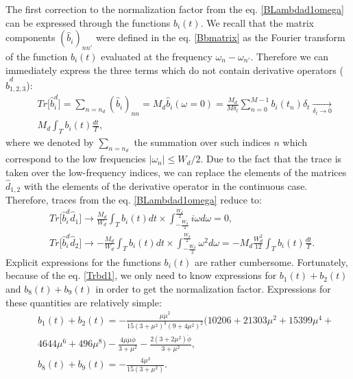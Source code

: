 \documentclass{article}
\begin{document}
The first correction to the normalization factor from the eq$.$ \eqref{BLambdad1omega} can be expressed through the functions $b_{i}(t)$. We recall that the matrix components $(\hat{b}_{i})_{nn'}$ were defined in the eq$.$ \eqref{Bbmatrix} as the Fourier transform of the function $b_{i}(t)$ evaluated at the frequency $\omega_{n} - \omega_{n'}$. Therefore we can immediately express the three terms which do not contain derivative operators ($\hat{b}_{1,2,3}^{d}$):
\begin{eqnarray}\label{BTrb}
    &&Tr\Big[\hat{b}_{i}^{d}\Big] = \sum_{n = n_{d}} (\hat{b}_{i})_{nn} = M_{d} \hat{b}_{i}(\omega = 0) = \frac{M_{d}}{M\delta_{t}} \sum_{n = 0}^{M-1} b_{i}(t_{n}) \delta_{t} \underset{\delta_{t}\rightarrow0}{\rightarrow}\nonumber\\
    &&M_{d} \int_{T} b_{i}(t) \frac{dt}{T},
\end{eqnarray}
where we denoted by $\sum_{n=n_{d}}$ the summation over such indices $n$ which correspond to the low frequencies $|\omega_{n}|\leq W_{d}/2$. Due to the fact that the trace is taken over the low-frequency indices, we can replace the elements of the matrices $\hat{d}_{1,2}$ with the elements of the derivative operator in the continuous case. Therefore, traces from the eq$.$ \eqref{BLambdad1omega} reduce to:
\begin{align}
    &Tr\Big[\hat{b}_{i}^{d}\hat{d}_{1}\Big] \rightarrow \frac{M_{d}}{W_{d}} \int_{T} b_{i}(t) dt \times \int_{-\frac{W_{d}}{2}}^{\frac{W_{d}}{2}} i\omega d\omega = 0,\label{Trbd1}\\
    &Tr\Big[\hat{b}_{i}^{d}\hat{d}_{2}\Big] \rightarrow - \frac{M_{d}}{W_{d}} \int_{T} b_{i}(t) dt \times \int_{-\frac{W_{d}}{2}}^{\frac{W_{d}}{2}} \omega^{2} d\omega = -M_{d} \frac{W_{d}^{2}}{12} \int_{T} b_{i}(t) \frac{dt}{T}.\label{Trbd2}
\end{align}
Explicit expressions for the functions $b_{i}(t)$ are rather cumbersome. Fortunately, because of the eq$.$ \eqref{Trbd1}, we only need to know expressions for $b_{1}(t)+b_{2}(t)$ and $b_{8}(t)+b_{9}(t)$ in order to get the normalization factor. Expressions for these quantities are relatively simple:
\begin{eqnarray}\label{Bsumsofbs}
    &&b_{1}(t) + b_{2}(t) = -\frac{\mu\dot{\mu}^{2}}{15(3+\mu^{2})^{3}(9+4\mu^{2})^{2}}(10206 + 21303\mu^{2}+
    15399\mu^{4}+\nonumber\\
    && 4644\mu^{6} +496\mu^{8})-\frac{4\mu\dot{\mu}\dot{\phi}}{3+\mu^{2}} -\frac{2(3+2\mu^{2})\ddot{\phi}}{3+\mu^{2}},\nonumber\\
    &&b_{8}(t)+b_{9}(t) = -\frac{4 \mu^{3}}{15(3+\mu^{2})}.
\end{eqnarray}
\end{document}
